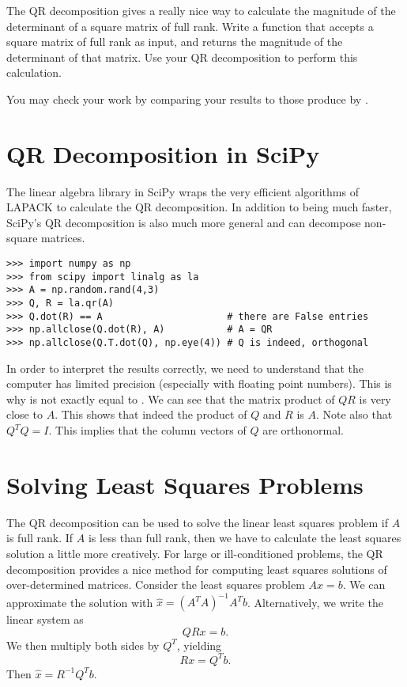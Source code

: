 \begin{problem}
The QR decomposition gives a really nice way to calculate the magnitude of the determinant 
of a square matrix of full rank.
Write a function  that accepts a square matrix of full rank as input, and returns
the magnitude of the determinant of that matrix. Use your QR decomposition to perform this
calculation.

You may check your work by comparing your results to those produce by . 
\end{problem}

\section*{QR Decomposition in SciPy}
The linear algebra library in SciPy wraps the very efficient algorithms of LAPACK to calculate the QR decomposition.
In addition to being much faster, SciPy's QR decomposition is also much more general and can decompose non-square matrices.
\begin{lstlisting}
>>> import numpy as np
>>> from scipy import linalg as la
>>> A = np.random.rand(4,3)
>>> Q, R = la.qr(A)
>>> Q.dot(R) == A                      # there are False entries
>>> np.allclose(Q.dot(R), A)           # A = QR
>>> np.allclose(Q.T.dot(Q), np.eye(4)) # Q is indeed, orthogonal
\end{lstlisting}

In order to interpret the results correctly, we need to understand that the computer has limited precision (especially with floating point numbers).
This is why  is not exactly equal to .
We can see that the matrix product of $QR$ is very close to $A$.
This shows that indeed the product of $Q$ and $R$ is $A$.
Note also that $Q^T Q = I$.
This implies that the column vectors of $Q$ are orthonormal.

\section*{Solving Least Squares Problems}
The QR decomposition can be used to solve the linear least squares problem if $A$ is full rank.
If $A$ is less than full rank, then we have to calculate the least squares solution a little more creatively.
For large or ill-conditioned problems, the QR decomposition provides
a nice method for computing least squares solutions of
over-determined matrices.
Consider the least squares problem $Ax=b$.
We can approximate the solution with $\widehat x = (A^T A)^{-1}A^T b$.
Alternatively, we write the linear system as
\[ Q R x = b. \]
We then multiply both sides by $Q^T$, yielding
\[ R x = Q^T b. \]
Then $\widehat x = R^{-1} Q^T b$.

